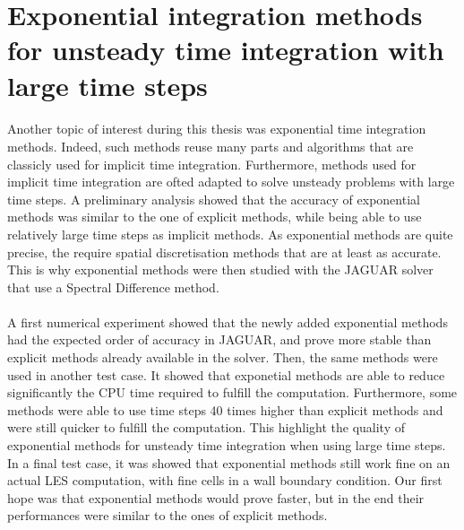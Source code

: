   \section*{Exponential integration methods for unsteady time integration with large time steps}

    \paragraph{}
    Another topic of interest during this thesis was exponential time integration methods.
    Indeed, such methods reuse many parts and algorithms that are classicly used for implicit time integration.
    Furthermore, methods used for implicit time integration are ofted adapted to solve unsteady problems with large time steps.
    A preliminary analysis showed that the accuracy of exponential methods was similar to the one of explicit methods, while being able to use relatively large time steps as implicit methods.
    As exponential methods are quite precise, the require spatial discretisation methods that are at least as accurate.
    This is why exponential methods were then studied with the JAGUAR solver that use a Spectral Difference method.

    \paragraph{}
    A first numerical experiment showed that the newly added exponential methods had the expected order of accuracy in JAGUAR, and prove more stable than explicit methods already available in the solver.
    Then, the same methods were used in another test case.
    It showed that exponetial methods are able to reduce significantly the CPU time required to fulfill the computation.
    Furthermore, some methods were able to use time steps 40 times higher than explicit methods and were still quicker to fulfill the computation.
    This highlight the quality of exponential methods for unsteady time integration when using large time steps.
    In a final test case, it was showed that exponential methods still work fine on an actual LES computation, with fine cells in a wall boundary condition.
    Our first hope was that exponential methods would prove faster, but in the end their performances were similar to the ones of explicit methods.

